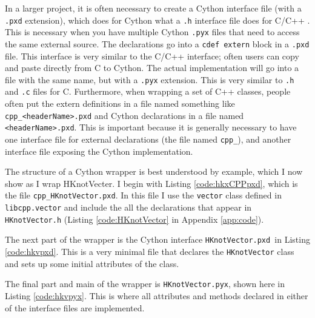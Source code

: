     In a larger project, it is often necessary to create a Cython interface file (with a \texttt{.pxd} extension), which does for Cython what a \texttt{.h} interface file does for C/C++ . This is necessary when you have multiple Cython \texttt{.pyx} files that need to access the same external source. The declarations go into a  \texttt{cdef extern} block in a \texttt{.pxd} file. This interface is very similar to the C/C++ interface; often users can copy and paste directly from C to Cython. The actual implementation will go into a file with the same name, but with a \texttt{.pyx} extension. This is very similar to \texttt{.h} and \texttt{.c}  files for C. Furthermore, when wrapping a set of C++ classes, people often put the extern definitions in a file named something like \texttt{cpp\_<headerName>.pxd} and Cython declarations in a file named \texttt{<headerName>.pxd}. This is important because it is generally necessary to have one interface file for external declarations (the file named \texttt{cpp\_}), and another interface file exposing the Cython implementation.

    The structure of a Cython wrapper is best understood by example, which I now show as I wrap HKnotVecter.
    I begin with Listing \ref{code:hkxCPPpxd}, which is the file \texttt{cpp\_HKnotVector.pxd}. In this file I use the \texttt{vector} class defined in \texttt{libcpp.vector} and include the all the declarations that appear in \texttt{HKnotVector.h} (Listing \ref{code:HKnotVector} in Appendix \ref{app:code}).

    
    \mainstretch{}

    \noindent The next part of the wrapper is the Cython interface \texttt{HKnotVector.pxd }in Listing \ref{code:hkvpxd}. This is a very minimal file that declares the \texttt{HKnotVector} class and sets up some initial attributes of the class.

    
    \mainstretch{}

    The final part and main of the wrapper is \texttt{HKnotVector.pyx}, shown here in Listing \ref{code:hkvpyx}. This is where all attributes and methods declared in either of the interface files are implemented.

